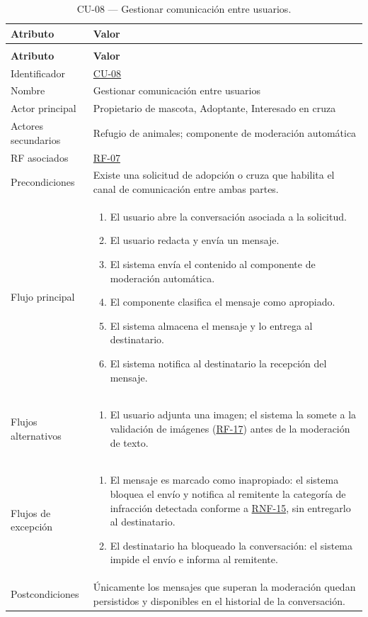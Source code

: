 \documentclass[journal,onecolumn]{IEEEtran}
\makeatletter
\newenvironment{atributos}[2]{%
	\small
	\begin{longtable}{@{}>{\raggedright\arraybackslash}p{4.2cm} >{\raggedright\arraybackslash}p{11.2cm}@{}}
		\caption{#2}\label{tab:#1}\\
		\toprule
		\textbf{Atributo} & \textbf{Valor} \\
		\midrule
		\endfirsthead
		\multicolumn{2}{@{}l}{\small\itshape (continuación)}\\
		\toprule
		\textbf{Atributo} & \textbf{Valor} \\
		\midrule
		\endhead
		\bottomrule
		\endlastfoot
	}{%
	\end{longtable}
	\normalsize
}
\makeatother
\begin{document}
	\begin{atributos}{CU-08}{CU-08 --- Gestionar comunicación entre usuarios.}
		Identificador & \hyperref[tab:CU-08]{CU-08} \\
		Nombre & Gestionar comunicación entre usuarios \\
		Actor principal & Propietario de mascota, Adoptante, Interesado en cruza \\
		Actores secundarios & Refugio de animales; componente de moderación automática \\
		RF asociados & \hyperref[tab:RF-07]{RF-07} \\
		Precondiciones & Existe una solicitud de adopción o cruza que habilita el canal de comunicación entre ambas partes. \\
		Flujo principal &
		\begin{enumerate}[leftmargin=*, nosep]
			\item El usuario abre la conversación asociada a la solicitud.
			\item El usuario redacta y envía un mensaje.
			\item El sistema envía el contenido al componente de moderación automática.
			\item El componente clasifica el mensaje como apropiado.
			\item El sistema almacena el mensaje y lo entrega al destinatario.
			\item El sistema notifica al destinatario la recepción del mensaje.
		\end{enumerate} \\
		Flujos alternativos &
		\begin{enumerate}[leftmargin=*, nosep]
			\item[2.1] El usuario adjunta una imagen; el sistema la somete a la validación de imágenes (\hyperref[tab:RF-17]{RF-17}) antes de la moderación de texto.
		\end{enumerate} \\
		Flujos de excepción &
		\begin{enumerate}[leftmargin=*, nosep]
			\item[4.1] El mensaje es marcado como inapropiado: el sistema bloquea el envío y notifica al remitente la categoría de infracción detectada conforme a \hyperref[tab:RNF-15]{RNF-15}, sin entregarlo al destinatario.
			\item[5.1] El destinatario ha bloqueado la conversación: el sistema impide el envío e informa al remitente.
		\end{enumerate} \\
		Postcondiciones & Únicamente los mensajes que superan la moderación quedan persistidos y disponibles en el historial de la conversación. \\
	\end{atributos}
	
\end{document}
